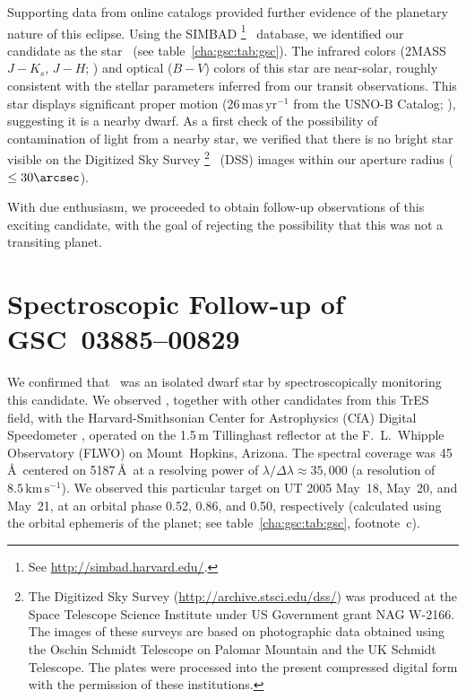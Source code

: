 Supporting data from online catalogs provided further evidence of the
planetary nature of this eclipse. Using the SIMBAD%
\footnote{See \url{http://simbad.harvard.edu/}.}%
\ database, we identified our candidate as the star \gscOTE\ (see
table~\ref{cha:gsc:tab:gsc}). The infrared colors (2MASS $J-K_{s}$, $J-H$;
\citealt{Cutri_Skrutskie_van-Dyk:2003a}) and optical ($B-V$)
colors of this star are near-solar, roughly consistent with the
stellar parameters inferred from our transit observations. This star
displays significant proper motion (26\,mas\,$\mathrm{yr^{-1}}$ from the USNO-B
Catalog; \citealt{Monet_Levine_Canzian:aj:2003a}), suggesting it is a
nearby dwarf. As a first check of the possibility of contamination of
light from a nearby star, we verified that there is no bright star
visible on the Digitized Sky Survey%
\footnote{%
The Digitized Sky Survey (\url{http://archive.stsci.edu/dss/}) was produced at the Space Telescope Science Institute under US Government grant NAG W-2166.
The images of these surveys are based on photographic data obtained using the Oschin Schmidt Telescope on Palomar Mountain and the UK Schmidt Telescope.
The plates were processed into the present compressed digital form with the permission of these institutions.%
}%
\ (DSS) images within our aperture radius ($\leq 30\arcsec$).

With due enthusiasm, we proceeded to obtain follow-up observations of
this exciting candidate, with the goal of rejecting the possibility
that this was not a transiting planet.

\section{Spectroscopic Follow-up of \mbox{GSC 03885--00829}}\label{cha:gsc:sec:spec}

We confirmed that \gscOTE\ was an isolated dwarf star by
spectroscopically monitoring this candidate. We observed \gscOTE,
together with other candidates from this TrES field, with the
Harvard-Smithsonian Center for Astrophysics (CfA) Digital Speedometer
\citep{Latham:ASP:1992a}, operated on the 1.5\,m Tillinghast reflector
at the F.\ L.\ Whipple Observatory (FLWO) on Mount~Hopkins, Arizona.
The spectral coverage was 45\,\AA\ centered on 5187\,\AA\ at a
resolving power of $\lambda / \Delta \lambda \approx 35,\!000$ (a
resolution of $8.5\,\mathrm{km\,s^{-1}}$). We observed this particular
target on UT 2005 May~18, May~20, and May~21, at an orbital phase 0.52,
0.86, and 0.50, respectively (calculated using the orbital ephemeris
of the planet; see table~\ref{cha:gsc:tab:gsc}, footnote~c).

